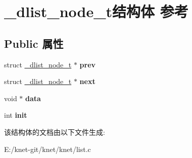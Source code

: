 \hypertarget{struct__dlist__node__t}{}\section{\+\_\+dlist\+\_\+node\+\_\+t结构体 参考}
\label{struct__dlist__node__t}
\subsection*{Public 属性}
\begin{DoxyCompactItemize}
\item 
\hypertarget{struct__dlist__node__t_aa81273afe3e8305f6ba9669c1815aa82}{}struct \hyperlink{struct__dlist__node__t}{\+\_\+dlist\+\_\+node\+\_\+t} $\ast$ {\bfseries prev}\label{struct__dlist__node__t_aa81273afe3e8305f6ba9669c1815aa82}

\item 
\hypertarget{struct__dlist__node__t_aa5c54bdaf97510c6481c3bc45bb33411}{}struct \hyperlink{struct__dlist__node__t}{\+\_\+dlist\+\_\+node\+\_\+t} $\ast$ {\bfseries next}\label{struct__dlist__node__t_aa5c54bdaf97510c6481c3bc45bb33411}

\item 
\hypertarget{struct__dlist__node__t_af3a2021b810fa6100cec2da211c1f5f9}{}void $\ast$ {\bfseries data}\label{struct__dlist__node__t_af3a2021b810fa6100cec2da211c1f5f9}

\item 
\hypertarget{struct__dlist__node__t_a028979e7d24a0abae1d7261f2f48b394}{}int {\bfseries init}\label{struct__dlist__node__t_a028979e7d24a0abae1d7261f2f48b394}

\end{DoxyCompactItemize}


该结构体的文档由以下文件生成\+:\begin{DoxyCompactItemize}
\item 
E\+:/knet-\/git/knet/knet/list.\+c\end{DoxyCompactItemize}
